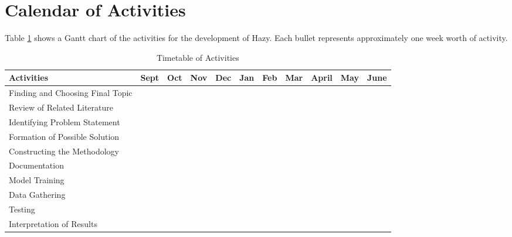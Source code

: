 \section{Calendar of Activities}

Table \ref{tab:timetableactivities} shows a Gantt chart of the activities for the development of Hazy.  Each bullet represents approximately
one week worth of activity.

%
%
\newcommand{\weekone}{\textbullet}
\newcommand{\weektwo}{\textbullet \textbullet}
\newcommand{\weekthree}{\textbullet \textbullet \textbullet}
\newcommand{\weekfour}{\textbullet \textbullet \textbullet \textbullet}

%
%
\begin{comment}
   \newcommand{\weekone}{$\star$}
   \newcommand{\weektwo}{$\star \star$}
   \newcommand{\weekthree}{$\star \star \star$}
   \newcommand{\weekfour}{$\star \star \star \star$ }
\end{comment}



\begin{table}[ht]   %
\centering
\caption{Timetable of Activities} \vspace{0.25em}
\begin{tabular}{|p{2in}|c|c|c|c|c|c|c|c|c|c|} \hline
\centering Activities  & Sept  & Oct & Nov & Dec & Jan & Feb & Mar & April & May & June\\ \hline
Finding and Choosing Final Topic      & ~~~\weektwo &  &  &  &  &  & &&& \\ \hline
Review of Related Literature &   & \weekfour & \weekfour &  &  &  & & ~~~\weekone& \weekone~~~ & \\ \hline
Identifying Problem Statement     &  ~~~\weektwo &  \weekone~~~  &  & &  &  &  &&&\\ \hline
Formation of Possible Solution    &   & ~~~\weektwo  &  \weekone~~~ &  & & & &&&  \\ \hline
Constructing the Methodology     &   &  &   ~~~\weektwo & \weekthree ~~ & &  & &&& \\ \hline

Documentation & ~~~\weektwo  & \weekfour & \weekfour &\weekone ~~& & ~~~\weektwo &  & ~~~\weektwo & \weekone~~~ & ~~~\\ \hline
Model Training   &  &  &  & & & & \weekone~~~  & ~~~\weektwo & \weekone~~~  & \\ \hline
Data Gathering & & & & & &\weekfour&\weekfour& \weekfour & &~~~  \\ \hline
Testing     &   &  &  & \weekthree ~~ & &  & ~\weekone~ & ~~~\weekone & \weekone~~~ &  \\ \hline
Interpretation of Results     &   &  &  & \weekthree ~~ & &  & &~~~\weekone& \weekone~~~ & \\ \hline

\end{tabular}
\label{tab:timetableactivities}
\end{table}

